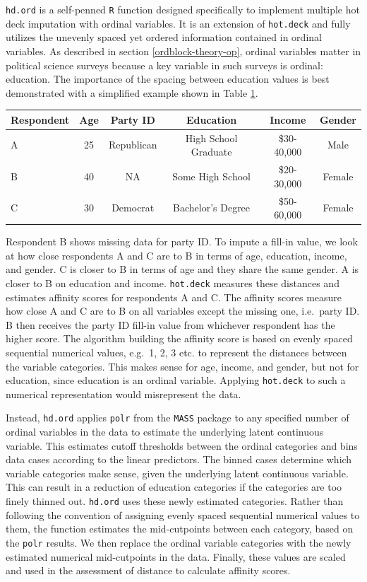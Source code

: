 \documentclass[12pt,econ]{sources/authesis}
\makeatletter
\def\caption{\refstepcounter\@captype \@dblarg{\@caption\@captype}}
\makeatother
\begin{document}
\texttt{hd.ord} is a self-penned \texttt{R} function designed specifically to implement multiple hot deck imputation with ordinal variables. It is an extension of \texttt{hot.deck} and fully utilizes the unevenly spaced yet ordered information contained in ordinal variables. As described in section \ref{ordblock-theory-op}, ordinal variables matter in political science surveys because a key variable in such surveys is ordinal: education. The importance of the spacing between education values is best demonstrated with a simplified example shown in Table \ref{ordmiss-ordspace}.
\begin{table}[!htbp] 
  \centering
  \caption{Illustrative Data}
  \label{ordmiss-ordspace}
  \begin{tabular}{lccccc}
  \bottomrule 
  \midrule
  Respondent & Age & Party ID & Education & Income & Gender\\
  \hline
  A & 25 & Republican & High School Graduate & \$30-40,000 & Male \\
  B & 40 & NA & Some High School &  \$20-30,000 & Female\\
  C & 30 & Democrat & Bachelor's Degree &  \$50-60,000 & Female\\
  \bottomrule 
  \end{tabular}
\end{table}
Respondent B shows missing data for party ID. To impute a fill-in value, we look at how close respondents A and C are to B in terms of age, education, income, and gender. C is closer to B in terms of age and they share the same gender. A is closer to B on education and income. \texttt{hot.deck} measures these distances and estimates affinity scores for respondents A and C. The affinity scores measure how close A and C are to B on all variables except the missing one, i.e.~party ID. B then receives the party ID fill-in value from whichever respondent has the higher score. The algorithm building the affinity score is based on evenly spaced sequential numerical values, e.g.~1, 2, 3 etc. to represent the distances between the variable categories. This makes sense for age, income, and gender, but not for education, since education is an ordinal variable. Applying \texttt{hot.deck} to such a numerical representation would misrepresent the data.

Instead, \texttt{hd.ord} applies \texttt{polr} from the \texttt{MASS} package to any specified number of ordinal variables in the data to estimate the underlying latent continuous variable. This estimates cutoff thresholds between the ordinal categories and bins data cases according to the linear predictors. The binned cases determine which variable categories make sense, given the underlying latent continuous variable. This can result in a reduction of education categories if the categories are too finely thinned out. \texttt{hd.ord} uses these newly estimated categories. Rather than following the convention of assigning evenly spaced sequential numerical values to them, the function estimates the mid-cutpoints between each category, based on the \texttt{polr} results. We then replace the ordinal variable categories with the newly estimated numerical mid-cutpoints in the data. Finally, these values are scaled and used in the assessment of distance to calculate affinity scores.
\end{document}

